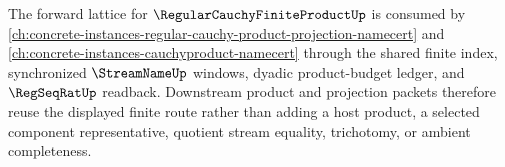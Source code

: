 The forward lattice for $\RegularCauchyFiniteProductUp$ is consumed by \autoref{ch:concrete-instances-regular-cauchy-product-projection-namecert} and \autoref{ch:concrete-instances-cauchyproduct-namecert} through the shared finite index, synchronized $\StreamNameUp$ windows, dyadic product-budget ledger, and $\RegSeqRatUp$ readback. Downstream product and projection packets therefore reuse the displayed finite route rather than adding a host product, a selected component representative, quotient stream equality, trichotomy, or ambient completeness.
